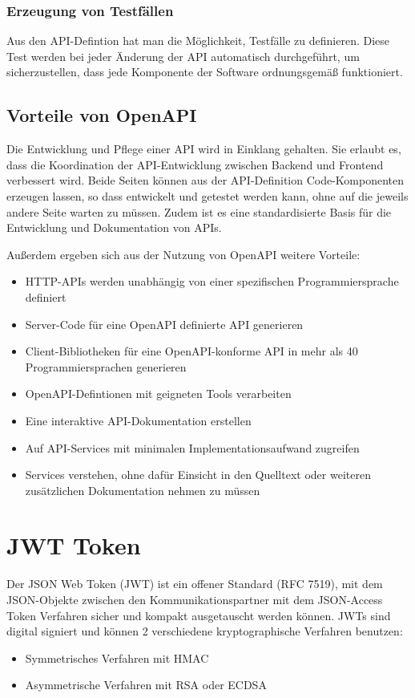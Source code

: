\subsubsection{Erzeugung von Testfällen}
Aus den API-Defintion hat man die Möglichkeit, Testfälle zu definieren. Diese Test werden bei jeder Änderung der API automatisch durchgeführt, 
um sicherzustellen, dass jede Komponente der Software ordnungsgemäß funktioniert.

\subsection{Vorteile von OpenAPI}
Die Entwicklung und Pflege einer API wird in Einklang gehalten. Sie erlaubt es, dass die Koordination der API-Entwicklung zwischen Backend und 
Frontend verbessert wird. Beide Seiten können aus der API-Definition Code-Komponenten erzeugen lassen, so dass entwickelt und getestet werden kann, 
ohne auf die jeweils andere Seite warten zu müssen. Zudem ist es eine standardisierte Basis für die Entwicklung und Dokumentation von APIs.

Außerdem ergeben sich aus der Nutzung von OpenAPI weitere Vorteile:
\begin{itemize}
    \item HTTP-APIs werden unabhängig von einer spezifischen Programmiersprache definiert
    \item Server-Code für eine OpenAPI definierte API generieren
    \item Client-Bibliotheken für eine OpenAPI-konforme API in mehr als 40 Programmiersprachen generieren
    \item OpenAPI-Defintionen mit geigneten Tools verarbeiten
    \item Eine interaktive API-Dokumentation erstellen
    \item Auf API-Services mit minimalen Implementationsaufwand zugreifen
    \item Services verstehen, ohne dafür Einsicht in den Quelltext oder weiteren zusätzlichen Dokumentation nehmen zu müssen
\end{itemize}

\newpage
\section{JWT Token}
\cite{JWTio}
\cite{JWTSecurityInsider}

Der JSON Web Token (JWT) ist ein offener Standard (RFC 7519), mit dem JSON-Objekte zwischen den Kommunikationspartner mit dem JSON-Access Token Verfahren 
sicher und kompakt ausgetauscht werden können. JWTs sind digital signiert und können 2 verschiedene kryptographische Verfahren benutzen:
\begin{itemize}
    \item Symmetrisches Verfahren mit HMAC
    \item Asymmetrische Verfahren mit RSA oder ECDSA
\end{itemize}

